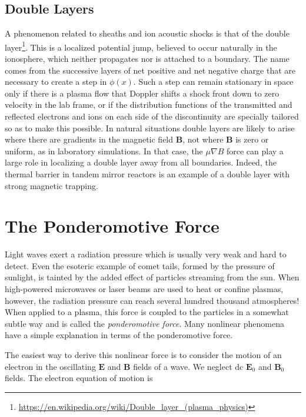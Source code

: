 \documentclass[
  notoc %
]{tufte-book}
\DeclareRobustCommand{\href}[2]{#2\footnote{\url{#1}}}
\begin{document}
\hypertarget{double-layers}{%
\subsection{Double Layers}\label{double-layers}}

A phenomenon related to sheaths and ion acoustic shocks is that of the
\href{https://en.wikipedia.org/wiki/Double_layer_(plasma_physics)}{double
layer}. This is a localized potential jump, believed to occur naturally
in the ionosphere, which neither propagates nor is attached to a
boundary. The name comes from the successive layers of net positive and
net negative charge that are necessary to create a step in \(\phi(x)\).
Such a step can remain stationary in space only if there is a plasma
flow that Doppler shifts a shock front down to zero velocity in the lab
frame, or if the distribution functions of the transmitted and reflected
electrons and ions on each side of the discontinuity are specially
tailored so as to make this possible. In natural situations double
layers are likely to arise where there are gradients in the magnetic
field \(\mathbf{B}\), not where \(\mathbf{B}\) is zero or uniform, as in
laboratory simulations. In that case, the \(\mu\nabla B\) force can play
a large role in localizing a double layer away from all boundaries.
Indeed, the thermal barrier in tandem mirror reactors is an example of a
double layer with strong magnetic trapping.

\hypertarget{sec:ponderomotive}{%
\section{The Ponderomotive Force}\label{sec:ponderomotive}}

Light waves exert a radiation pressure which is usually very weak and
hard to detect. Even the esoteric example of comet tails, formed by the
pressure of sunlight, is tainted by the added effect of particles
streaming from the sun. When high-powered microwaves or laser beams are
used to heat or confine plasmas, however, the radiation pressure can
reach several hundred thousand atmospheres! When applied to a plasma,
this force is coupled to the particles in a somewhat subtle way and is
called the \emph{ponderomotive force}. Many nonlinear phenomena have a
simple explanation in terms of the ponderomotive force.

The easiest way to derive this nonlinear force is to consider the motion
of an electron in the oscillating \(\mathbf{E}\) and \(\mathbf{B}\)
fields of a wave. We neglect dc \(\mathbf{E}_0\) and \(\mathbf{B}_0\)
fields. The electron equation of motion is
\end{document}
